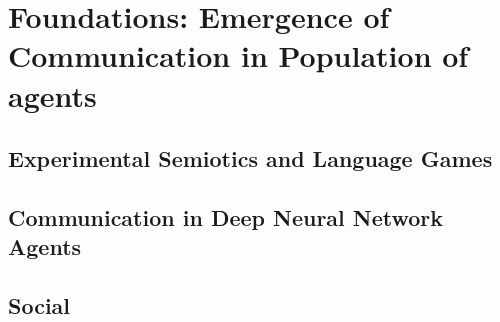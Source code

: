 \chapter{Foundations: Emergence of Communication in Population of agents}
\label{chap:foundation_formation}
\minitoc


\section{Experimental Semiotics and Language Games}

\section{Communication in Deep Neural Network Agents}

\section{Social \marl}


